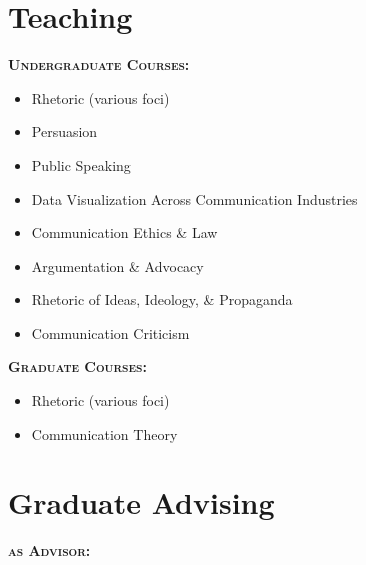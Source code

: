 \documentclass[10pt, a4paper]{article}
\begin{document}
\section*{Teaching}

\textbf{\textsc{Undergraduate Courses:}}

\noindent
\begin{itemize}[noitemsep]
    \item Rhetoric (various foci)
    \item Persuasion
    \item Public Speaking
    \item Data Visualization Across Communication Industries
    \item Communication Ethics \& Law
    \item Argumentation \& Advocacy
    \item Rhetoric of Ideas, Ideology, \& Propaganda
    \item Communication Criticism
\end{itemize}

\textbf{\textsc{Graduate Courses:}}

\noindent
\begin{itemize}[noitemsep]
    \item Rhetoric (various foci)
    \item Communication Theory
\end{itemize}



\section*{Graduate Advising}

\textbf{\textsc{as Advisor:}}
\end{document}
